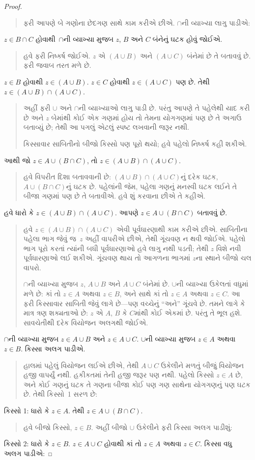 \begin{proof}
\begin{quote}
ફરી આપણે બે ગણોના છેદગણ સાથે કામ કરીએ છીએ. $\cap$ની
વ્યાખ્યા લાગુ પાડીએ:
\end{quote}
$z \in B \cap C$ હોવાથી~$\cap$ની વ્યાખ્યા મુજબ $z$, $B$
અને $C$ બંનેનું ઘટક હોવું જોઈએ.
\begin{quote}
હવે ફરી નિષ્કર્ષ જોઈએ. $z$ એ $(A \cup B)$ અને $(A \cup C)$
બંનેમાં છે તે બતાવવું છે. ફરી જવાબ તરત મળે છે.
\end{quote}
$z \in B$ હોવાથી $z \in (A \cup B)$. $z \in C$ હોવાથી
$z \in (A
\cup C)$ પણ છે. તેથી $z \in (A \cup B) \cap (A \cup C)$.
\begin{quote}
અહીં ફરી $\cup$ અને $\cap$ની વ્યાખ્યાઓ લાગુ પાડી છે.
પરંતુ આપણે તે પહેલેથી યાદ કરી છે અને $z$ બેમાંથી કોઈ એક
ગણમાં હોય તો તેમના યોગગણમાં પણ છે તે અગાઉ બતાવ્યું છે;
તેથી આ પગલું એટલું સ્પષ્ટ લખવાની જરૂર નથી.

કિસ્સાવાર સાબિતીનો બીજો કિસ્સો પણ પૂરો થયો; હવે પહેલો
નિષ્કર્ષ કહી શકીએ.
\end{quote}
આથી જો $z \in A \cup (B \cap C)$, તો $z \in (A \cup B) \cap (A \cup C)$.
\begin{quote}
હવે વિપરીત દિશા બતાવવાની છે: $(A \cup B) \cap (A \cup C)$નું
દરેક ઘટક, $A \cup (B \cap
C)$નું ઘટક છે. પહેલાંની જેમ, પહેલા ગણનું મનસ્વી
ઘટક લઈને તે બીજા ગણમાં પણ છે તે બતાવીએ. હવે શું
કરવાના છીએ તે કહીએ.
\end{quote}
હવે ધારો કે $z \in (A \cup B) \cap (A \cup C)$. આપણે
$z \in A \cup (B \cap C)$ બતાવવું છે.
\begin{quote}
હવે $z \in (A \cup B) \cap (A
\cup C)$ એવી પૂર્વધારણાથી કામ કરીએ છીએ. સાબિતીના પહેલા ભાગ
જેવું જ~$z$ અહીં વાપરીએ છીએ, તેથી ગૂંચવણ ન થવી જોઈએ. પહેલો
ભાગ પૂરો કરતાં ત્યાંની બધી પૂર્વધારણાઓ હવે લાગુ નથી પડતી;
તેથી $z$ વિશે નવી પૂર્વધારણાઓ લઈ શકીએ. ગૂંચવણ થાય તો આગળના
ભાગમાં $z$ના સ્થાને બીજો ચલ વાપરો.

$\cap$ની વ્યાખ્યા મુજબ $z$, $A \cup B$ અને $A \cup C$
બંનેમાં છે. $\cup$ની વ્યાખ્યા ઉકેલતાં વધુમાં મળે છે: કાં તો
$z \in A$ અથવા $z \in B$, અને સાથે કાં તો $z \in A$
અથવા $z \in
C$. આ ફરી કિસ્સાવાર સાબિતી જેવું લાગે છે---પણ વચ્ચેનું
``અને'' ગૂંચવે છે. તમને લાગે કે માત્ર ત્રણ શક્યતાઓ છે:
$z$ એ $A$, $B$ કે $C$માંથી કોઈ એકમાં છે. પરંતુ તે ભૂલ
હશે. સાવચેતીથી દરેક વિયોજન અલગથી જોઈએ.
\end{quote}
$\cap$ની વ્યાખ્યા મુજબ $z \in A \cup B$ અને $z \in A \cup C$.
$\cup$ની વ્યાખ્યા મુજબ $z \in A$ અથવા $z \in B$.
કિસ્સા અલગ પાડીએ.
\begin{quote}
હાલમાં પહેલું વિયોજન લઈએ છીએ, તેથી $A \cup C$ ઉકેલીને
મળતું બીજું વિયોજન હજી વાપર્યું નથી. હકીકતમાં તેની હજી જરૂર
પણ નથી. પહેલો કિસ્સો $z \in A$ છે, અને કોઈ ગણનું
ઘટક તે ગણના બીજા કોઈ પણ ગણ સાથેના યોગગણનું પણ
ઘટક છે. તેથી કિસ્સો~1 સરળ છે:
\end{quote}
કિસ્સો 1: ધારો કે $z \in A$. તેથી $z \in A \cup (B \cap
C)$.
\begin{quote}
હવે બીજો કિસ્સો, $z \in B$. અહીં બીજો $\cup$ ઉકેલીને
ફરી કિસ્સા અલગ પાડીશું:
\end{quote}
કિસ્સો 2: ધારો કે $z \in B$. $z \in A \cup C$ હોવાથી
કાં તો $z \in
A$ અથવા $z \in C$. કિસ્સા વધુ અલગ પાડીએ:


\end{proof}
